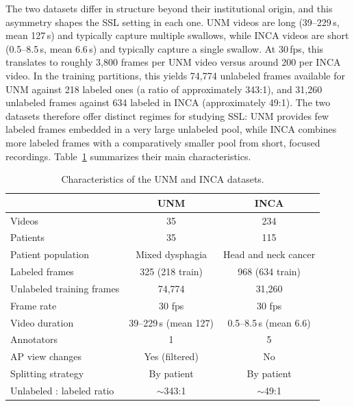 \documentclass[
  msc,
  american
]{ThesisPUC_v2}
\begin{document}
The two datasets differ in structure beyond their institutional origin, and this asymmetry shapes the SSL setting in each one. UNM videos are long (39--229\,s, mean 127\,s) and typically capture multiple swallows, while INCA videos are short (0.5--8.5\,s, mean 6.6\,s) and typically capture a single swallow. At 30\,fps, this translates to roughly 3{,}800 frames per UNM video versus around 200 per INCA video. In the training partitions, this yields 74{,}774 unlabeled frames available for UNM against 218 labeled ones (a ratio of approximately 343:1), and 31{,}260 unlabeled frames against 634 labeled in INCA (approximately 49:1). The two datasets therefore offer distinct regimes for studying SSL: UNM provides few labeled frames embedded in a very large unlabeled pool, while INCA combines more labeled frames with a comparatively smaller pool from short, focused recordings. Table~\ref{tab:datasets} summarizes their main characteristics.

\begin{table}[!t]
\centering
\footnotesize
\caption{Characteristics of the UNM and INCA datasets.}
\label{tab:datasets}
\begin{tabular}{@{}lcc@{}}
\toprule
                          & \textbf{UNM}              & \textbf{INCA} \\
\midrule
Videos                    & 35                        & 234 \\
Patients                  & 35                        & 115 \\
Patient population        & Mixed dysphagia           & Head and neck cancer \\
Labeled frames            & 325 (218 train)           & 968 (634 train) \\
Unlabeled training frames & 74{,}774                  & 31{,}260 \\
Frame rate                & 30 fps                    & 30 fps \\
Video duration            & 39--229\,s (mean 127)     & 0.5--8.5\,s (mean 6.6) \\
Annotators                & 1                         & 5 \\
AP view changes           & Yes (filtered)            & No \\
Splitting strategy        & By patient                & By patient \\
Unlabeled : labeled ratio & $\sim$343:1               & $\sim$49:1 \\
\bottomrule
\end{tabular}
\end{table}
\end{document}
